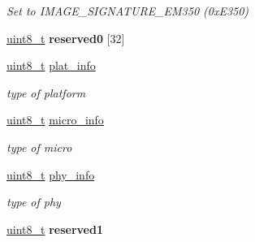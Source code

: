 \begin{DoxyCompactItemize}
\begin{DoxyCompactList}\small\item\em Set to I\-M\-A\-G\-E\-\_\-\-S\-I\-G\-N\-A\-T\-U\-R\-E\-\_\-\-E\-M350 (0x\-E350) \end{DoxyCompactList}\item 
\hypertarget{structem3xx__header__t_a3815ffdb1bd4a85cf7264add6f501a04}{\hyperlink{group__hal_gae1affc9ca37cfb624959c866a73f83c2}{uint8\-\_\-t} {\bfseries reserved0} \mbox{[}32\mbox{]}}\label{structem3xx__header__t_a3815ffdb1bd4a85cf7264add6f501a04}

\item 
\hypertarget{structem3xx__header__t_a92f03de0e95503b40dd0b3f5f6fea571}{\hyperlink{group__hal_gae1affc9ca37cfb624959c866a73f83c2}{uint8\-\_\-t} \hyperlink{structem3xx__header__t_a92f03de0e95503b40dd0b3f5f6fea571}{plat\-\_\-info}}\label{structem3xx__header__t_a92f03de0e95503b40dd0b3f5f6fea571}

\begin{DoxyCompactList}\small\item\em type of platform \end{DoxyCompactList}\item 
\hypertarget{structem3xx__header__t_a5fe184b033b139667d6bb11e7e635068}{\hyperlink{group__hal_gae1affc9ca37cfb624959c866a73f83c2}{uint8\-\_\-t} \hyperlink{structem3xx__header__t_a5fe184b033b139667d6bb11e7e635068}{micro\-\_\-info}}\label{structem3xx__header__t_a5fe184b033b139667d6bb11e7e635068}

\begin{DoxyCompactList}\small\item\em type of micro \end{DoxyCompactList}\item 
\hypertarget{structem3xx__header__t_a0a3dfa3e71fdb6dcbbfc46ac07b1f57b}{\hyperlink{group__hal_gae1affc9ca37cfb624959c866a73f83c2}{uint8\-\_\-t} \hyperlink{structem3xx__header__t_a0a3dfa3e71fdb6dcbbfc46ac07b1f57b}{phy\-\_\-info}}\label{structem3xx__header__t_a0a3dfa3e71fdb6dcbbfc46ac07b1f57b}

\begin{DoxyCompactList}\small\item\em type of phy \end{DoxyCompactList}\item 
\hypertarget{structem3xx__header__t_a2a2556147677ece60b8aadf4a0d608ed}{\hyperlink{group__hal_gae1affc9ca37cfb624959c866a73f83c2}{uint8\-\_\-t} {\bfseries reserved1}}\label{structem3xx__header__t_a2a2556147677ece60b8aadf4a0d608ed}


\end{DoxyCompactItemize}
